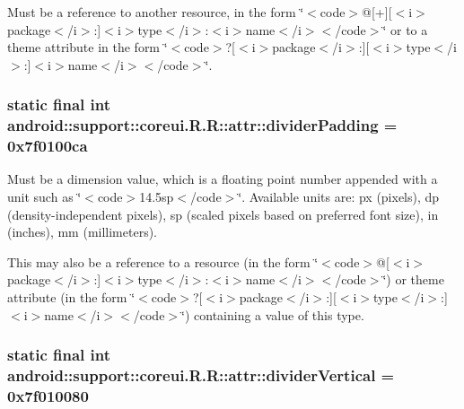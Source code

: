 Must be a reference to another resource, in the form \char`\"{}$<$code$>$@\mbox{[}+\mbox{]}\mbox{[}$<$i$>$package$<$/i$>$:\mbox{]}$<$i$>$type$<$/i$>$:$<$i$>$name$<$/i$>$$<$/code$>$\char`\"{} or to a theme attribute in the form \char`\"{}$<$code$>$?\mbox{[}$<$i$>$package$<$/i$>$:\mbox{]}\mbox{[}$<$i$>$type$<$/i$>$:\mbox{]}$<$i$>$name$<$/i$>$$<$/code$>$\char`\"{}. \hypertarget{classandroid_1_1support_1_1coreui_1_1_r_1_1attr_ed4b60b980160f7513952b87fc8beeee}{
\subsubsection[{dividerPadding}]{\setlength{\rightskip}{0pt plus 5cm}static final int android::support::coreui.R.R::attr::dividerPadding = 0x7f0100ca}}
\label{classandroid_1_1support_1_1coreui_1_1_r_1_1attr_ed4b60b980160f7513952b87fc8beeee}


Must be a dimension value, which is a floating point number appended with a unit such as \char`\"{}$<$code$>$14.5sp$<$/code$>$\char`\"{}. Available units are: px (pixels), dp (density-independent pixels), sp (scaled pixels based on preferred font size), in (inches), mm (millimeters). 

This may also be a reference to a resource (in the form \char`\"{}$<$code$>$@\mbox{[}$<$i$>$package$<$/i$>$:\mbox{]}$<$i$>$type$<$/i$>$:$<$i$>$name$<$/i$>$$<$/code$>$\char`\"{}) or theme attribute (in the form \char`\"{}$<$code$>$?\mbox{[}$<$i$>$package$<$/i$>$:\mbox{]}\mbox{[}$<$i$>$type$<$/i$>$:\mbox{]}$<$i$>$name$<$/i$>$$<$/code$>$\char`\"{}) containing a value of this type. \hypertarget{classandroid_1_1support_1_1coreui_1_1_r_1_1attr_50bba44d4a7d9582aed2835b46b74781}{
\subsubsection[{dividerVertical}]{\setlength{\rightskip}{0pt plus 5cm}static final int android::support::coreui.R.R::attr::dividerVertical = 0x7f010080}}
\label{classandroid_1_1support_1_1coreui_1_1_r_1_1attr_50bba44d4a7d9582aed2835b46b74781}



